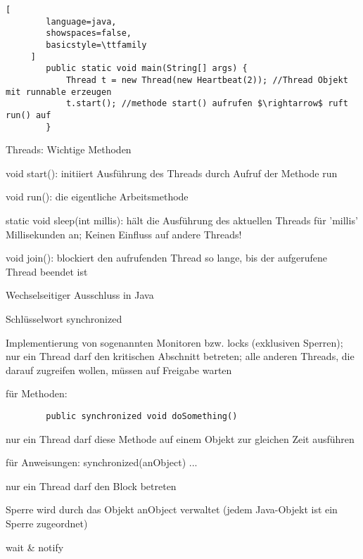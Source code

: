 \documentclass[10pt]{article}
\begin{document}
\begin{itemize*}
\begin{itemize*}
\begin{lstlisting}[
        language=java,
        showspaces=false,
        basicstyle=\ttfamily
     ]
        public static void main(String[] args) {
            Thread t = new Thread(new Heartbeat(2)); //Thread Objekt mit runnable erzeugen
            t.start(); //methode start() aufrufen $\rightarrow$ ruft run() auf
        }
    \end{lstlisting}
  \item Threads: Wichtige Methoden
  \begin{itemize*}
    \item void start(): initiiert Ausführung des Threads durch Aufruf der Methode run
    \item void run(): die eigentliche Arbeitsmethode
    \item static void sleep(int millis): hält die Ausführung des aktuellen Threads für 'millis' Millisekunden an; Keinen Einfluss auf andere Threads!
    \item void join(): blockiert den aufrufenden Thread so lange, bis der aufgerufene Thread beendet ist
  \end{itemize*}
  \item Wechselseitiger Ausschluss in Java
  \begin{itemize*}
    \item Schlüsselwort synchronized
    \begin{itemize*}
      \item Implementierung von sogenannten Monitoren bzw. locks (exklusiven Sperren); nur ein Thread darf den kritischen Abschnitt betreten; alle anderen Threads, die darauf zugreifen wollen, müssen auf Freigabe warten
      \item für Methoden:
      \begin{lstlisting}
        public synchronized void doSomething()
    \end{lstlisting}
      \begin{itemize*}
        \item nur ein Thread darf diese Methode auf einem Objekt zur gleichen Zeit ausführen
      \end{itemize*}
      \item für Anweisungen: synchronized(anObject) { ... }
      \begin{itemize*}
        \item nur ein Thread darf den Block betreten
        \item Sperre wird durch das Objekt anObject verwaltet (jedem Java-Objekt ist ein Sperre zugeordnet)
      \end{itemize*}
    \end{itemize*}
    \item wait \& notify

\end{itemize*}
\end{itemize*}
\end{itemize*}
\end{document}
